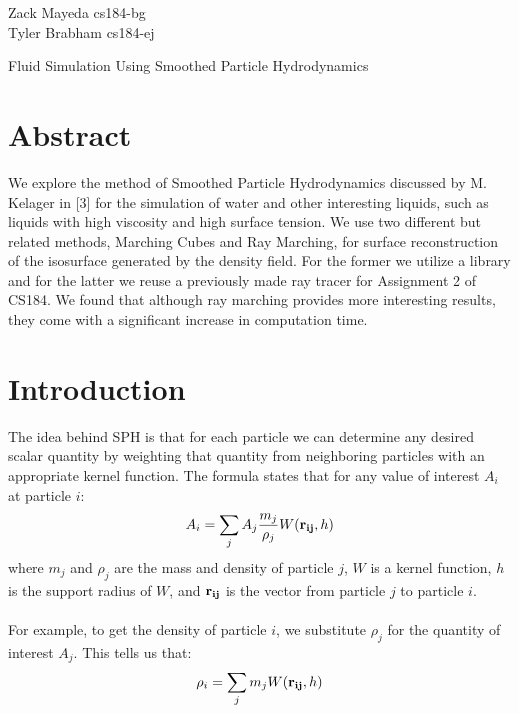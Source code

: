 \documentclass[11pt]{article}
\begin{document}
\begin{flushright}
Zack Mayeda cs184-bg \\
Tyler Brabham cs184-ej
\end{flushright}

\begin{center}
\LARGE
Fluid Simulation Using Smoothed Particle Hydrodynamics
\end{center}

\section*{Abstract}
We explore the method of Smoothed Particle Hydrodynamics discussed by M. Kelager in [3] for the simulation of water and other interesting liquids, such as liquids with high viscosity and high surface tension. We use two different but related methods, Marching Cubes and Ray Marching, for surface reconstruction of the 
isosurface generated by the density field. For the former we utilize a library and for the latter we reuse a previously made ray tracer for Assignment 2 of CS184.  We found that although ray marching provides more interesting results, they come with a significant increase in computation time.

\section*{Introduction}
The idea behind SPH is that for each particle we can determine any desired scalar quantity by weighting that quantity from neighboring particles with an appropriate kernel function. The formula states that for any value of interest $A_i$ at particle $i$: $$A_i = \sum_{j} A_j \frac{m_j}{\rho_j}W({\bf r_{ij}},h)$$
where $m_j$ and $\rho_j$ are the mass and density of particle $j$, $W$ is a kernel function, $h$ is the support radius of $W$, and ${\bf r_{ij}}$ is the vector from particle $j$ to particle $i$. 
\\ \\
For example, to get the density of particle $i$, we substitute $\rho_j$ for the quantity of interest $A_j$. This tells us that: 
\\
$$\rho_i = \sum_{j} m_jW({\bf r_{ij}},h)$$
\end{document}
